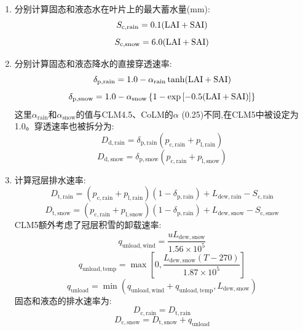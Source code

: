 \begin{enumerate}
  \item 分别计算固态和液态水在叶片上的最大蓄水量(mm):
    \begin{equation}
      S_{\mathrm{c,rain}}=0.1({\rm LAI}+{\rm SAI})
    \end{equation}
    \begin{equation}
      S_{\mathrm{c,snow}}=6.0({\rm LAI}+{\rm SAI})
    \end{equation}
  \item 分别计算固态和液态降水的直接穿透速率:
    \begin{equation}
      \delta_{\mathrm{p,rain}}=1.0 - \alpha_{\mathrm{rain}} \tanh({\rm LAI}+{\rm SAI})
    \end{equation}
    \begin{equation}
      \delta_{\mathrm{p,snow}}=1.0 - \alpha_{\mathrm{snow}}\left\{1-\exp\left[-0.5({\rm LAI}+{\rm SAI})\right]\right\}
    \end{equation}
    这里$\alpha_{\mathrm{rain}}$和$\alpha_{\mathrm{snow}}$的值与CLM4.5、CoLM的$\alpha$ (0.25)不同,在CLM5中被设定为1.0。穿透速率也被拆分为:
    \begin{equation}
      D_{\mathrm{d,rain}}=\delta_{\mathrm{p,rain}}(p_{\mathrm {c,rain}} +p_{\mathrm{l,rain}})
    \end{equation}
    \begin{equation}
      D_{\mathrm{d,snow}}=\delta_{\mathrm{p,snow}}(p_{\mathrm {c,rain}} +p_{\mathrm{l,snow}})
    \end{equation}
  \item 计算冠层排水速率:
    \begin{equation}
      D_{\mathrm {t,rain}}=(p_{\mathrm {c,rain}} +p_{\mathrm{l,rain}})(1-\delta_{\mathrm{p,rain}})+L_{\mathrm{dew,rain}}-S_{\mathrm{c,rain}}
    \end{equation}
    \begin{equation}
      D_{\mathrm {t,snow}}=(p_{\mathrm {c,rain}} +p_{\mathrm{l,snow}})(1-\delta_{\mathrm{p,rain}})+L_{\mathrm{dew,snow}}-S_{\mathrm{c,snow}}
    \end{equation}
    CLM5额外考虑了冠层积雪的卸载速率:
    \begin{equation}\label{q_unl_wind}
      q_{\mathrm{unload,wind}}=\frac{uL_{\mathrm{dew,snow}}}{1.56\times 10^5}
    \end{equation}
    \begin{equation}
      q_{\mathrm{unload,temp}}=\max\left[0, \frac{L_{\mathrm{dew,snow}}(T-270)}{1.87\times 10^5}\right]
    \end{equation}
    \begin{equation}\label{q_unl_tot}
      q_{\mathrm{unload}}=\min(q_{\mathrm{unload,wind}}+q_{\mathrm{unload,temp}},L_{\mathrm{dew,snow}})
    \end{equation}
    固态和液态的排水速率为:
    \begin{equation}
      D_{\mathrm{c,rain}}=D_{\mathrm {t,rain}}
    \end{equation}
    \begin{equation}
      D_{\mathrm{c,snow}}=D_{\mathrm {t,snow}}+q_{\mathrm{unload}}
    \end{equation}
\end{enumerate}
